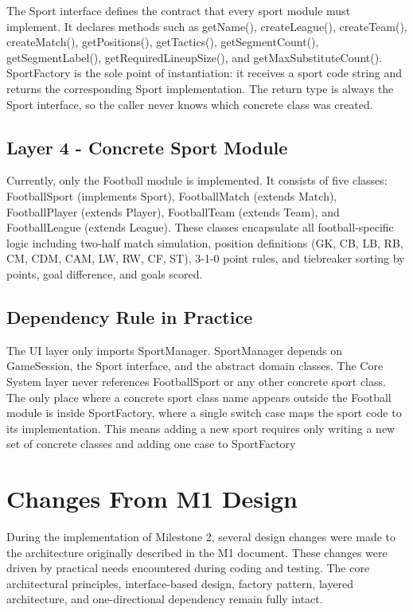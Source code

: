 \documentclass[11pt,a4paper]{article}
\begin{document}
The Sport interface defines the contract that every sport module must implement. It declares methods such as getName(), createLeague(), createTeam(), createMatch(), getPositions(), getTactics(), getSegmentCount(), getSegmentLabel(), getRequiredLineupSize(), and getMaxSubstituteCount(). SportFactory is the sole point of instantiation: it receives a sport code string and returns the corresponding Sport implementation. The return type is always the Sport interface, so the caller never knows which concrete class was created.

\subsection*{Layer 4 - Concrete Sport Module}

Currently, only the Football module is implemented. It consists of five classes: FootballSport (implements Sport), FootballMatch (extends Match), FootballPlayer (extends Player), FootballTeam (extends Team), and FootballLeague (extends League). These classes encapsulate all football-specific logic including two-half match simulation, position definitions (GK, CB, LB, RB, CM, CDM, CAM, LW, RW, CF, ST), 3-1-0 point rules, and tiebreaker sorting by points, goal difference, and goals scored.

\subsection*{Dependency Rule in Practice}

The UI layer only imports SportManager. SportManager depends on GameSession, the Sport interface, and the abstract domain classes. The Core System layer never references FootballSport or any other concrete sport class. The only place where a concrete sport class name appears outside the Football module is inside SportFactory, where a single switch case maps the sport code to its implementation. This means adding a new sport requires only writing a new set of concrete classes and adding one case to SportFactory

\section{Changes From M1 Design}

During the implementation of Milestone 2, several design changes were made to the architecture originally described in the M1 document. These changes were driven by practical needs encountered during coding and testing. The core architectural principles, interface-based design, factory pattern, layered architecture, and one-directional dependency remain fully intact.
\end{document}
